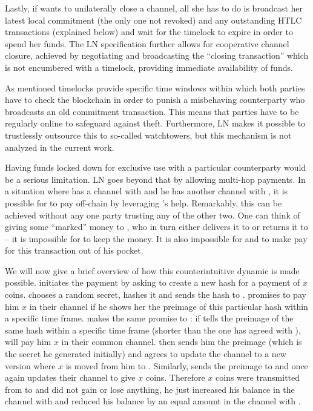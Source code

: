     Lastly, if \alice{} wants to unilaterally close a channel, all she has to do
    is broadcast her latest local commitment (the only one not revoked) and any
    outstanding HTLC transactions (explained below) and wait for the timelock to
    expire in order to spend her funds. The LN specification further allows for
    cooperative channel closure, achieved by negotiating and broadcasting the
    ``closing transaction'' which is not encumbered with a timelock, providing
    immediate availability of funds.

    As mentioned timelocks provide specific time windows within which both
    parties have to check the blockchain in order to punish a misbehaving
    counterparty who  broadcasts an old commitment transaction. This means that
    parties have to be regularly online to safeguard against theft. Furthermore,
    LN makes it possible to trustlessly outsource this to so-called watchtowers,
    but this mechanism is not analyzed in the current work.

    Having funds locked down for exclusive use with a particular counterparty
    would be a serious limitation. LN goes beyond that by allowing multi-hop
    payments. In a situation where \alice{} has a channel with \bob{} and he has
    another channel with \charlie{}, it is possible for \alice{} to pay
    \charlie{} off-chain by leveraging \bob's help. Remarkably, this can be
    achieved without any one party trusting any of the other two. One can think
    of \alice{} giving some ``marked'' money to \bob{}, who in turn either
    delivers it to \charlie{} or returns it to \alice{} -- it is impossible for
    \bob{} to keep the money. It is also impossible for \alice{} and \charlie{}
    to make \bob{} pay for this transaction out of his pocket.

    We will now give a brief overview of how this counterintuitive dynamic
    is made possible. \alice{} initiates the payment by asking \charlie{} to
    create a new hash for a payment of $x$ coins. \charlie{} chooses a random
    secret, hashes it and sends the hash to \alice. \alice{} promises \bob{} to
    pay him $x$ in their channel if he shows her the preimage of this particular
    hash within a specific time frame. \bob{} makes the same promise to
    \charlie{}: if \charlie{} tells \bob{} the preimage of the same hash within
    a specific time frame (shorter than the one \bob{} has agreed with
    \alice{}), \bob{} will pay him $x$ in their common channel. \charlie{} then
    sends him the preimage (which is the secret he generated initially) and
    \bob{} agrees to update the channel to a new version where $x$ is moved from
    him to \charlie. Similarly, \bob{} sends the preimage to \alice{} and once
    again \alice{} updates their channel to give \bob{} $x$ coins. Therefore $x$
    coins were transmitted from \alice{} to \charlie{} and \bob{} did not gain
    or lose anything, he just increased his balance in the channel with \alice{}
    and reduced his balance by an equal amount in the channel with \charlie.

